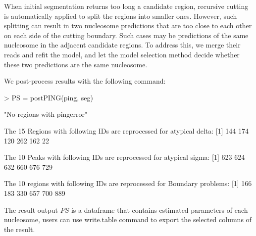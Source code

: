 \documentclass[11pt]{article}
\begin{document}
When initial segmentation returns too long a candidate region, recursive cutting is automatically applied to split the regions into smaller ones. However, such splitting can result in two nucleosome predictions that are too close to each other on each side of the cutting boundary. Such cases may be predictions of the same nucleosome in the adjacent candidate regions. To address this, we merge their reads and refit the model, and let the model selection method decide whether these two predictions are the same nucleosome.

We post-process results with the following command:


\begin{Schunk}
\begin{Sinput}
> PS = postPING(ping, seg)
\end{Sinput}
\begin{Soutput}
[1] "No regions with pingerror"

 The 15 Regions with following IDs are reprocessed for atypical delta: 
[1] 144 174 120 262 162  22

 The 10 Peaks with following IDs are reprocessed for atypical sigma: 
[1] 623 624 632 660 676 729

 The 10 regions with following IDs are reprocessed for Boundary problems: 
[1] 166 183 330 657 700 889
\end{Soutput}
\end{Schunk}
The result output $PS$ is a dataframe that contains estimated parameters of each nucleosome, users can use write.table command to export the selected columns of the result.
\end{document}

